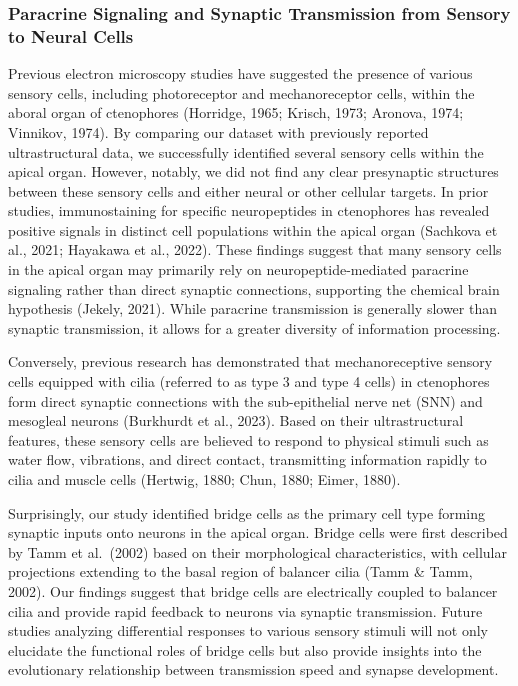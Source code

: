 \documentclass[
  11pt,
]{article}
\begin{document}
\subsubsection{Paracrine Signaling and Synaptic Transmission from
Sensory to Neural
Cells}\label{paracrine-signaling-and-synaptic-transmission-from-sensory-to-neural-cells}

Previous electron microscopy studies have suggested the presence of
various sensory cells, including photoreceptor and mechanoreceptor
cells, within the aboral organ of ctenophores (Horridge, 1965; Krisch,
1973; Aronova, 1974; Vinnikov, 1974). By comparing our dataset with
previously reported ultrastructural data, we successfully identified
several sensory cells within the apical organ. However, notably, we did
not find any clear presynaptic structures between these sensory cells
and either neural or other cellular targets. In prior studies,
immunostaining for specific neuropeptides in ctenophores has revealed
positive signals in distinct cell populations within the apical organ
(Sachkova et al., 2021; Hayakawa et al., 2022). These findings suggest
that many sensory cells in the apical organ may primarily rely on
neuropeptide-mediated paracrine signaling rather than direct synaptic
connections, supporting the chemical brain hypothesis (Jekely, 2021).
While paracrine transmission is generally slower than synaptic
transmission, it allows for a greater diversity of information
processing.

Conversely, previous research has demonstrated that mechanoreceptive
sensory cells equipped with cilia (referred to as type 3 and type 4
cells) in ctenophores form direct synaptic connections with the
sub-epithelial nerve net (SNN) and mesogleal neurons (Burkhurdt et al.,
2023). Based on their ultrastructural features, these sensory cells are
believed to respond to physical stimuli such as water flow, vibrations,
and direct contact, transmitting information rapidly to cilia and muscle
cells (Hertwig, 1880; Chun, 1880; Eimer, 1880).

Surprisingly, our study identified bridge cells as the primary cell type
forming synaptic inputs onto neurons in the apical organ. Bridge cells
were first described by Tamm et al.~(2002) based on their morphological
characteristics, with cellular projections extending to the basal region
of balancer cilia (Tamm \& Tamm, 2002). Our findings suggest that bridge
cells are electrically coupled to balancer cilia and provide rapid
feedback to neurons via synaptic transmission. Future studies analyzing
differential responses to various sensory stimuli will not only
elucidate the functional roles of bridge cells but also provide insights
into the evolutionary relationship between transmission speed and
synapse development.
\end{document}
